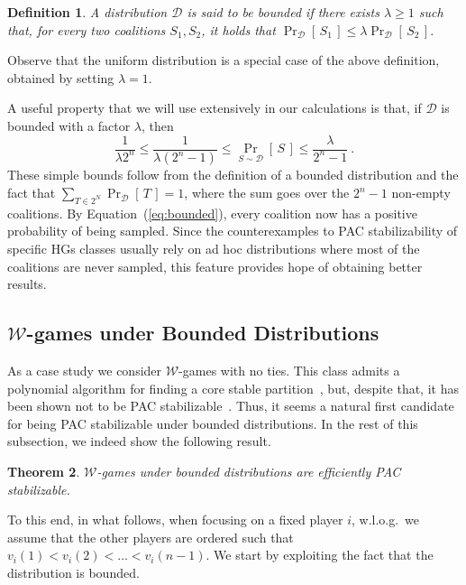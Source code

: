 \documentclass[letterpaper]{article} %
\newtheorem{theorem}{Theorem}[section]
\newtheorem{definition}[theorem]{Definition}
\newcommand{\distribution}{\mathcal{D}}
\newcommand{\Prob}[2]{\Pr_{#2}\left[\,#1\,\right]}
\newcommand{\W}{\ensuremath{\mathcal{W}}}
\begin{document}
\begin{definition}\label{def:bounded_dist}
A distribution $\distribution$ is said to be \emph{bounded} if there exists $\lambda \geq 1$ such that, for every two coalitions $S_1, S_2$, it holds that $\Prob{S_1}{\distribution}\leq \lambda \Prob{S_2}{\distribution}$.
\end{definition}
Observe that the uniform distribution is a special case of the above definition, obtained by setting $\lambda=1$.

A useful property that we will use extensively in our calculations is that, if $\distribution$ is bounded with a factor $\lambda$, then
\begin{equation}\label{eq:bounded}
    \frac{1}{\lambda 2^n}\le\frac{1}{\lambda(2^n-1)}\leq\Prob{S}{S\sim\distribution}\leq \frac{\lambda}{2^n-1} \ .
\end{equation}
These simple bounds follow from the definition of a bounded distribution and the fact that $\sum_{T\in 2^N} \Prob{T}{\distribution}=1$, where the sum goes over the $2^n-1$ non-empty coalitions.
By Equation~(\ref{eq:bounded}), every coalition now has a positive probability of being sampled. Since the counterexamples to PAC stabilizability of specific HGs classes usually rely on ad hoc distributions where most of the coalitions are never sampled, this feature provides hope of obtaining better results.

\subsection{$\mathcal{W}$-games under Bounded Distributions} \label{sec:w_games}
As a case study we consider $\mathcal{W}$-games with no ties. This class admits a polynomial algorithm for finding a core stable partition~\cite{CechlarovaH04}, but, despite that, it has been shown not to be PAC stabilizable~\cite{SliwinskiZ17}. Thus, it seems a natural first candidate for being PAC stabilizable under bounded distributions. In the rest of this subsection, we indeed show the following result.

\begin{theorem}\label{thm:WgamesBoundedDistributions}
$\W$-games under bounded distributions are efficiently PAC stabilizable.
\end{theorem}

To this end, in what follows, when focusing on a fixed player $i$, w.l.o.g.\ we assume that the other players are ordered such that $v_i(1) < v_i(2) < \ldots < v_i(n-1)$. We start by exploiting the fact that the distribution is bounded.
\end{document}
